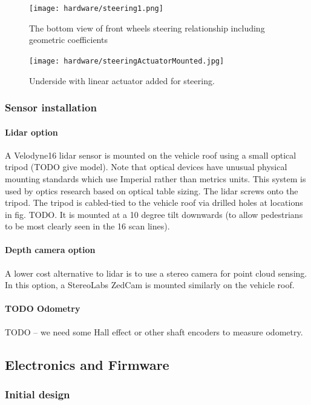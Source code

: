 \documentclass[a4paper]{article}
\begin{document}
\begin{figure}[h]
	\texttt{[image: hardware/steering1.png]}
	\caption{The bottom view of front wheels steering relationship including geometric coefficients}
	\label{fig:steering}
\end{figure}


\begin{figure}[h]
	\texttt{[image: hardware/steeringActuatorMounted.jpg]}
	\caption{Underside with linear actuator added for steering.}
	\label{fig:actuatorMounted}
\end{figure}

\subsubsection{Sensor installation}
\paragraph{Lidar option}
A Velodyne16 lidar sensor is mounted on the vehicle roof using a small optical tripod (TODO give model). Note that optical devices have unusual physical mounting standards which use Imperial rather than metrics units.  This system is used by optics research based on optical table sizing.   The lidar screws onto the tripod. The tripod is cabled-tied to the vehicle roof via  drilled holes at locations in fig. TODO.  It is mounted at a 10 degree tilt downwards (to allow pedestrians to be most clearly seen in the 16 scan lines).

\paragraph{Depth camera option}
A lower cost alternative to lidar is to use a stereo camera for point cloud sensing. In this option, a StereoLabs ZedCam is mounted similarly on the vehicle roof.

\paragraph{TODO Odometry}
TODO -- we need some Hall effect or other shaft encoders to measure odometry.


\subsection{Electronics and Firmware}

\subsubsection{Initial design}
\end{document}
